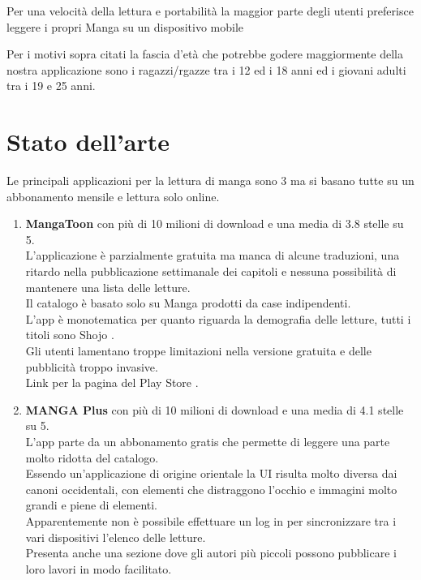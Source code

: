 \documentclass{report}
\begin{document}
Per una velocità della lettura e portabilità la maggior parte degli
utenti preferisce leggere i propri Manga su un dispositivo mobile \cite{NLTreport}

Per i motivi sopra citati la fascia d'età che potrebbe godere
maggiormente della nostra applicazione sono i ragazzi/rgazze tra i 12 ed
i 18 anni ed i giovani adulti tra i 19 e 25 anni.

\section{Stato dell'arte}

Le principali applicazioni per la lettura di manga sono 3 ma si basano
tutte su un abbonamento mensile e lettura solo online.

\begin{enumerate}
\def\labelenumi{\arabic{enumi}.}
\item
  \textbf{MangaToon} con più di 10 milioni di download e una media di
  3.8 stelle su 5.\\
  L'applicazione è parzialmente gratuita ma manca di alcune traduzioni,
  una ritardo nella pubblicazione settimanale dei capitoli e nessuna
  possibilità di mantenere una lista delle letture.\\
  Il catalogo è basato solo su Manga prodotti da case indipendenti.\\
  L'app è monotematica per quanto riguarda la demografia delle letture,
		tutti i titoli sono Shojo \cite{shooManga}.\\
  Gli utenti lamentano troppe limitazioni nella versione gratuita e
  delle pubblicità troppo invasive.\\
  Link per la pagina del Play Store .
\item
  \textbf{MANGA Plus }con più di 10 milioni di download e una media di
  4.1 stelle su 5.\\
  L'app parte da un abbonamento gratis che permette di leggere una parte
  molto ridotta del catalogo.\\
  Essendo un'applicazione di origine orientale la UI risulta molto
  diversa dai canoni occidentali, con elementi che distraggono l'occhio
  e immagini molto grandi e piene di elementi.\\
  Apparentemente non è possibile effettuare un log in per sincronizzare
  tra i vari dispositivi l'elenco delle letture.\\
  Presenta anche una sezione dove gli autori più piccoli possono
  pubblicare i loro lavori in modo facilitato.\\

\end{enumerate}
\end{document}
